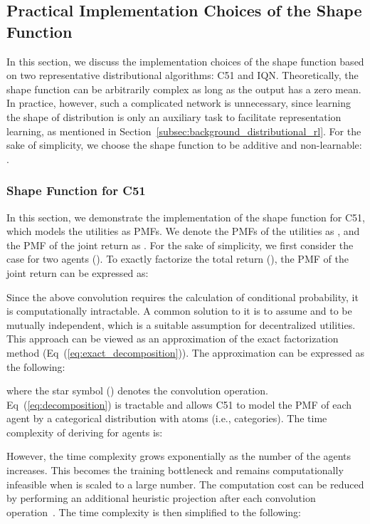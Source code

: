 \documentclass[twoside,11pt]{article}
\begin{document}
\subsection{Practical Implementation Choices of the Shape Function}
\label{subsec:methodology_a_practical_implementation_of_dfac}

In this section, we discuss the implementation choices of the shape function based on two representative distributional algorithms: C51 and IQN. Theoretically, the shape function can be arbitrarily complex as long as the output has a zero mean. In practice, however, such a complicated network is unnecessary, since learning the shape of distribution is only an auxiliary task to facilitate representation learning, as mentioned in Section~\ref{subsec:background_distributional_rl}. For the sake of simplicity, we choose the shape function to be additive and non-learnable: .

\subsubsection{Shape Function for C51}
\label{subsec:shape_function_for_c51}
In this section, we demonstrate the implementation of the shape function for C51, which models the utilities as PMFs.
We denote the PMFs of the utilities as , and the PMF of the joint return as .
For the sake of simplicity, we first consider the case for two agents ().
To exactly factorize the total return (), the PMF  of the joint return  can be expressed as:

Since the above convolution requires the calculation of conditional probability, it is computationally intractable. A common solution to it is to assume  and  to be mutually independent, which is a suitable assumption for decentralized utilities. This approach can be viewed as an approximation of the exact factorization method (Eq~(\ref{eq:exact_decomposition})).
The approximation can be expressed as the following:

where the star symbol () denotes the convolution operation. Eq~(\ref{eq:decomposition}) is tractable and allows C51 to model the PMF of each agent by a categorical distribution with  atoms (i.e., categories). The time complexity of deriving  for  agents is:

However, the time complexity grows exponentially as the number of the agents  increases. This becomes the training bottleneck and remains computationally infeasible when  is scaled to a large number. The computation cost can be reduced by performing an additional  heuristic projection after each convolution operation~\citep{Lin2019DR-DRL}. The time complexity is then simplified to the following:
\end{document}
